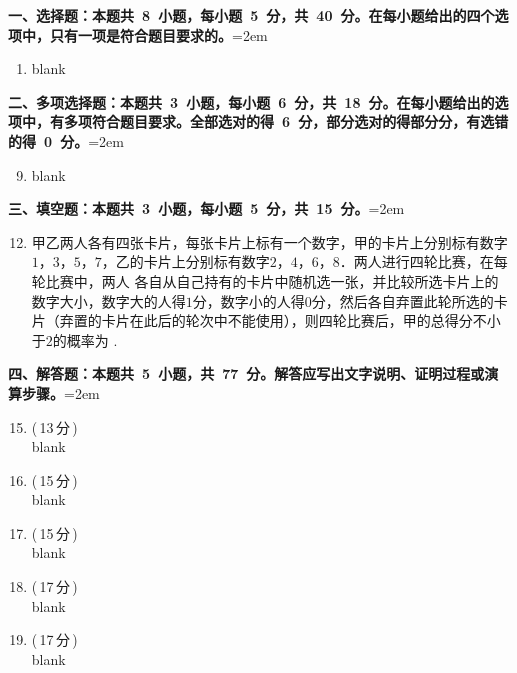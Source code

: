 \documentclass[twocolumn,landscape,UTF8]{ctexart}
\makeatletter
\newcommand{\fourch}[4]{\\\begin{tabular}{*{4}{@{}p{3.5cm}}}A.~#1 & B.~#2 & C.~#3 & D.~#4\end{tabular}} %
\newcommand{\twoch}[4]{\\\begin{tabular}{*{2}{@{}p{7cm}}}A.~#1 & B.~#2\end{tabular}\\\begin{tabular}{*{2}{@{}p{7cm}}}C.~#3 & D.~#4\end{tabular}}  %
\newcommand{\onech}[4]{\\A.~#1 \\ B.~#2 \\ C.~#3 \\ D.~#4}  %
\makeatother
\begin{document}
\begin{spacing}{1.2}

	\noindent\textbf{一、选择题：本题共~8~小题，每小题~5~分，共~40~分。在每小题给出的四个选项中，只有一项是符合题目要求的。}\hangindent=2em
		\begin{enumerate}
		\setcounter{enumi}{0}
	
			\item blank %

	\end{enumerate}
	
	\noindent\textbf{二、多项选择题：本题共~3~小题，每小题~6~分，共~18~分。在每小题给出的选项中，有多项符合题目要求。全部选对的得~6~分，部分选对的得部分分，有选错的得~0~分。}\hangindent=2em
		\begin{enumerate}
		\setcounter{enumi}{8}

			\item blank

	\end{enumerate}

	\noindent\textbf{三、填空题：本题共~3~小题，每小题~5~分，共~15~分。}\hangindent=2em
		\begin{enumerate}
		\setcounter{enumi}{11}
	
			\item 甲乙两人各有四张卡片，每张卡片上标有一个数字，甲的卡片上分别标有数字$1$，$3$，$5$，$7$，乙的卡片上分别标有数字$2$，$4$，$6$，$8$．两人进行四轮比赛，在每轮比赛中，两人
			各自从自己持有的卡片中随机选一张，并比较所选卡片上的数字大小，数字大的人得$1$分，数字小的人得$0$分，然后各自弃置此轮所选的卡片（弃置的卡片在此后的轮次中不能使用），则四轮比赛后，甲的总得分不小于$2$的概率为
			\underline{\qquad \qquad}.

	\end{enumerate}
	
	\noindent\textbf{四、解答题：本题共~5~小题，共~77~分。解答应写出文字说明、证明过程或演算步骤。}\hangindent=2em
		\begin{enumerate}
		\setcounter{enumi}{14}

		\item (\,13\,分\,) \\
		blank

		\item (\,15\,分\,) \\
		blank

		\item (\,15\,分\,) \\
		blank

		\item (\,17\,分\,) \\
		blank

		\item (\,17\,分\,) \\
		blank

		\end{enumerate}

\end{spacing}	
\end{document}
